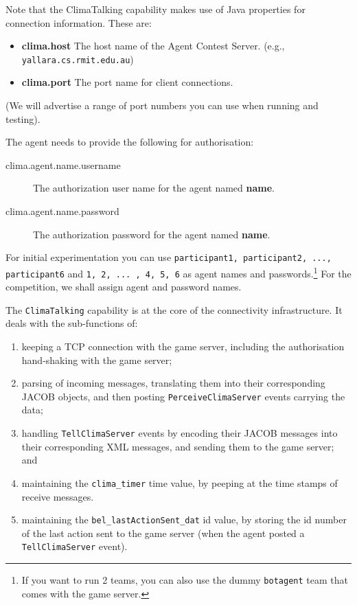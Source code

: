 \documentclass[10pt]{article}
\begin{document}
Note that the ClimaTalking capability makes use of Java properties for
connection  information. These are:
\begin{itemize}
\item {\bf clima.host} The host name of the Agent Contest
Server. (e.g., \texttt{yallara.cs.rmit.edu.au})
\item {\bf clima.port} The port name for client connections.
\end{itemize} (We will advertise a range of port numbers you can use
when running and testing).

The agent needs to provide the following for authorisation:
\begin{description}
\item[clima.agent.name.username] The authorization user name for
the agent named \textbf{name}.
\item[clima.agent.name.password] The authorization password for
the agent named \textbf{name}.
\end{description}
%
For initial experimentation you can use \texttt{participant1,
participant2, ..., participant6} and \texttt{1, 2, ... , 4, 5,
6} as agent names and passwords.\footnote{If you want to run 2
teams, you can also use the dummy \texttt{botagent} team that comes with the
game server.}
%
For the competition, we shall assign agent and password names.

The \texttt{ClimaTalking} capability is at the core of the connectivity
infrastructure. It deals with the sub-functions \nolinebreak of:
\begin{enumerate}
\item keeping a TCP connection with the game server, including the
authorisation hand-shaking with the game server;

\item parsing of incoming messages, translating them into their corresponding
JACOB objects, and then posting \texttt{PerceiveClimaServer} events
carrying the data;

\item handling \texttt{TellClimaServer} events by encoding their JACOB messages
into their corresponding XML messages, and sending them to the game
server; and

\item maintaining the \texttt{clima\_timer} time value, by peeping at the time
stamps of receive messages.


\item maintaining the \texttt{bel\_lastActionSent\_dat} id value, by storing the
id number of the last action sent to the game server (when the agent posted a
\texttt{TellClimaServer} event).
\end{enumerate}
\end{document}
